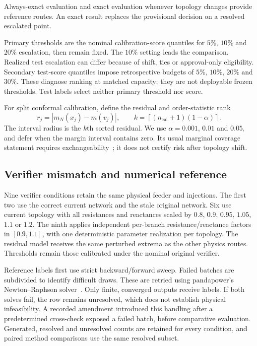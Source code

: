 Always-exact evaluation and exact evaluation whenever topology changes provide reference routes. An exact result replaces the provisional decision on a resolved escalated point.

Primary thresholds are the nominal calibration-score quantiles for $5\%$, $10\%$ and $20\%$ escalation, then remain fixed. The $10\%$ setting leads the comparison. Realized test escalation can differ because of shift, ties or approval-only eligibility. Secondary test-score quantiles impose retrospective budgets of $5\%$, $10\%$, $20\%$ and $30\%$. These diagnose ranking at matched capacity; they are not deployable frozen thresholds. Test labels select neither primary threshold nor score.

For split conformal calibration, define the residual and order-statistic rank
\begin{equation}
 r_j=|m_N(x_j)-m(v_j)|,\qquad
 k=\left\lceil(n_{\mathrm{cal}}+1)(1-\alpha)\right\rceil.
\end{equation}
The interval radius is the $k$th sorted residual. We use $\alpha=0.001$, $0.01$ and $0.05$, and defer when the margin interval contains zero. Its usual marginal coverage statement requires exchangeability~\cite{angelopoulos2023}; it does not certify risk after topology shift.

\subsection{Verifier mismatch and numerical reference}

Nine verifier conditions retain the same physical feeder and injections. The first two use the correct current network and the stale original network. Six use current topology with all resistances and reactances scaled by $0.8$, $0.9$, $0.95$, $1.05$, $1.1$ or $1.2$. The ninth applies independent per-branch resistance/reactance factors in $[0.9,1.1]$, with one deterministic parameter realization per topology. The residual model receives the same perturbed extrema as the other physics routes. Thresholds remain those calibrated under the nominal original verifier.

Reference labels first use strict backward/forward sweep. Failed batches are subdivided to identify difficult draws. These are retried using pandapower's Newton--Raphson solver~\cite{thurner2018}. Only finite, converged outputs receive labels. If both solves fail, the row remains unresolved, which does not establish physical infeasibility. A recorded amendment introduced this handling after a predetermined cross-check exposed a failed batch, before comparative evaluation. Generated, resolved and unresolved counts are retained for every condition, and paired method comparisons use the same resolved subset.

